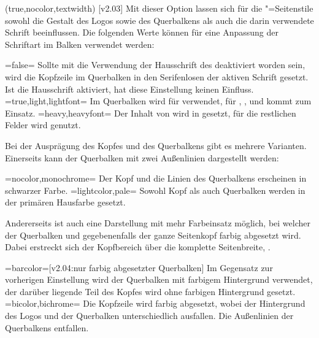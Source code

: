 \begin{DeclareEntity*}{}
\begin{DeclareEntity*}{}
\begin{DeclareEntity*}{}
\begin{Declaration}
  {}
  (true,nocolor,textwidth)
  [v2.03]
Mit dieser Option lassen sich für die "=Seitenstile 
sowohl die Gestalt des Logos sowie des Querbalkens als auch die darin 
verwendete Schrift beeinflussen. Die folgenden Werte können für eine Anpassung 
der Schriftart im Balken verwendet werden:
\begin{DeclareValues}
\itemval=false=
  Sollte mit  die Verwendung der Hausschrift des \TUDCDs 
  deaktiviert worden sein, wird die Kopfzeile im Querbalken in den Serifenlosen 
  der aktiven Schrift gesetzt. Ist die Hausschrift aktiviert, hat diese 
  Einstellung keinen Einfluss.
\itemval*=true,light,lightfont=
  Im Querbalken wird für   
  verwendet, für , , 
   und  kommt  zum 
  Einsatz.
\itemval=heavy,heavyfont=
  Der Inhalt von  wird in  gesetzt, für 
  die restlichen Felder wird  genutzt.
\end{DeclareValues}

Bei der Ausprägung des Kopfes und des Querbalkens gibt es mehrere Varianten. 
Einerseits kann der Querbalken mit zwei Außenlinien dargestellt werden:
\begin{DeclareValues}
\itemval=nocolor,monochrome=
  Der Kopf und die Linien des Querbalkens erscheinen in schwarzer Farbe.
\itemval=lightcolor,pale=
  Sowohl Kopf als auch Querbalken werden in der primären Hausfarbe gesetzt.
\end{DeclareValues}

Andererseits ist auch eine Darstellung mit mehr Farbeinsatz möglich, bei 
welcher der Querbalken und gegebenenfalls der ganze Seitenkopf farbig 
abgesetzt wird. Dabei erstreckt sich der Kopfbereich über die komplette 
Seitenbreite, .
\begin{DeclareValues}
\itemval=barcolor=[v2.04:nur farbig abgesetzter Querbalken]
  Im Gegensatz zur vorherigen Einstellung wird der Querbalken mit farbigem 
  Hintergrund verwendet, der darüber liegende Teil des Kopfes wird ohne 
  farbigen Hintergrund gesetzt.
\itemval=bicolor,bichrome=
  Die Kopfzeile wird farbig abgesetzt, wobei der Hintergrund des Logos und der 
  Querbalken unterschiedlich ausfallen. Die Außenlinien der Querbalkens 
  entfallen.
\end{DeclareValues}


\end{Declaration}
\end{DeclareEntity*}
\end{DeclareEntity*}
\end{DeclareEntity*}
